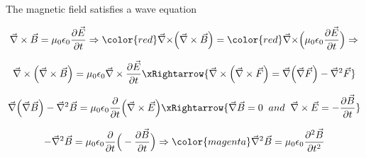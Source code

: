 \begin{frame}{The magnetic field satisfies a wave equation}

\begin{equation*}
  \vec{\nabla} \times \vec{B} =
  \mu_0 \epsilon_0 \frac{\partial \vec{E}}{\partial t}
  \Rightarrow
  {\color{red} \vec{\nabla} \times} \Big( \vec{\nabla} \times \vec{B} \Big) =
  {\color{red} \vec{\nabla} \times} \Big( \mu_0 \epsilon_0 \frac{\partial \vec{E}}{\partial t} \Big)
  \Rightarrow
\end{equation*}

\begin{equation*}
  \vec{\nabla} \times \Big( \vec{\nabla} \times \vec{B} \Big) =
  \mu_0 \epsilon_0  \vec{\nabla} \times \frac{\partial \vec{E}}{\partial t}
  \xRightarrow{ \vec{\nabla} \times \Big( \vec{\nabla} \times \vec{F} \Big) =
                \vec{\nabla} \Big( \vec{\nabla} \vec{F} \Big) - \vec{\nabla}^{2} \vec{F} }
\end{equation*}

\begin{equation*}
  \vec{\nabla} \Big( \vec{\nabla} \vec{B} \Big) - \vec{\nabla}^{2} \vec{B} =
  \mu_0 \epsilon_0  \frac{\partial}{\partial t} \Big( \vec{\nabla} \times \vec{E} \Big)
  \xRightarrow{ \vec{\nabla} \vec{B} = 0 \;\; and \;\;
                \vec{\nabla} \times \vec{E} = - \frac{\partial \vec{B}}{\partial t} }
\end{equation*}

\begin{equation*}
  - \vec{\nabla}^{2} \vec{B} =
  \mu_0 \epsilon_0  \frac{\partial}{\partial t} \Big(  - \frac{\partial \vec{B}}{\partial t} \Big)
  \Rightarrow
  {\color{magenta}
    \vec{\nabla}^{2} \vec{B} = \mu_0 \epsilon_0 \frac{\partial^{2} \vec{B}}{\partial t^{2}}
  }
\end{equation*}

\end{frame}

%
%
%
%


